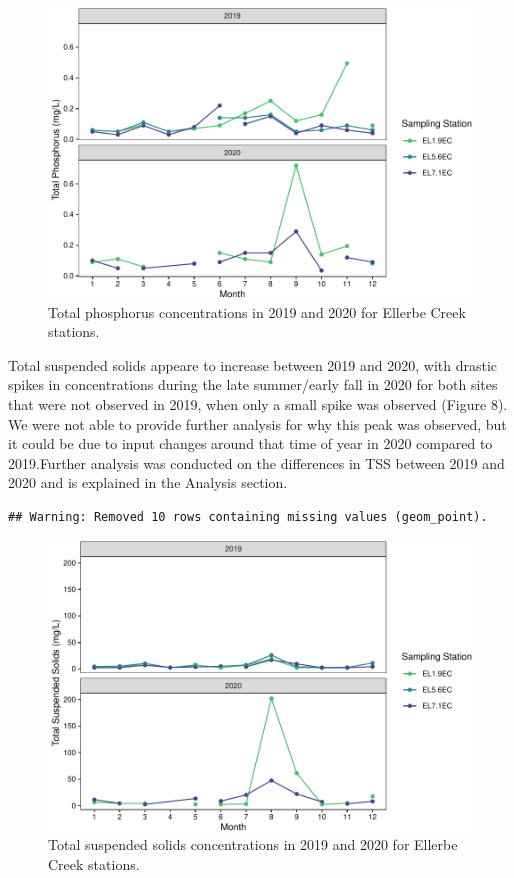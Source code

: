 \documentclass[
  12pt,
]{article}
\begin{document}
\begin{figure}
\centering
\includegraphics{August_Lindborg_ENV872_Project_files/figure-latex/unnamed-chunk-9-1.pdf}
\caption{Total phosphorus concentrations in 2019 and 2020 for Ellerbe
Creek stations.}
\end{figure}

Total suspended solids appeare to increase between 2019 and 2020, with
drastic spikes in concentrations during the late summer/early fall in
2020 for both sites that were not observed in 2019, when only a small
spike was observed (Figure 8). We were not able to provide further
analysis for why this peak was observed, but it could be due to input
changes around that time of year in 2020 compared to 2019.Further
analysis was conducted on the differences in TSS between 2019 and 2020
and is explained in the Analysis section.

\begin{verbatim}
## Warning: Removed 10 rows containing missing values (geom_point).
\end{verbatim}

\begin{figure}
\centering
\includegraphics{August_Lindborg_ENV872_Project_files/figure-latex/unnamed-chunk-10-1.pdf}
\caption{Total suspended solids concentrations in 2019 and 2020 for
Ellerbe Creek stations.}
\end{figure}
\end{document}
